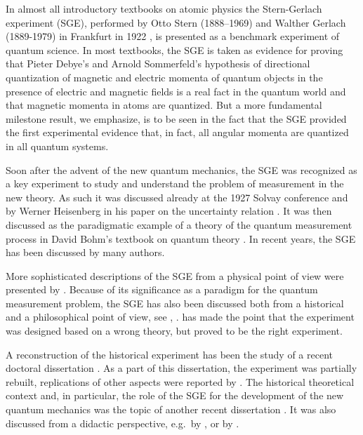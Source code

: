 \documentclass[12pt]{article}
\begin{document}
In almost all introductory textbooks on atomic physics the Stern-Gerlach experiment (SGE), performed by Otto Stern (1888--1969) and Walther Gerlach (1889-1979) in Frankfurt in 1922 
\citep{SternO1920Messung,GerlachWEtal1921Nachweis,GerlachWEtal1922Nachweis,GerlachWEtal1924Richtungsquantelung,GerlachW1925Richtungsquantelung}, is presented as a benchmark experiment of quantum science. In most textbooks, the SGE is taken as evidence for proving that Pieter Debye's \citep{DebyeP1916Quantenhypothese} and Arnold Sommerfeld's \citep{SommerfeldA1916Theorie} hypothesis of directional quantization of magnetic and electric momenta of quantum objects in the presence of electric and magnetic fields is a real fact in the quantum world and that magnetic momenta in atoms are quantized. But a more fundamental milestone result, we emphasize, is to be seen in the fact that the SGE provided the first experimental  evidence that, in fact, all angular momenta are quantized in all quantum systems. 

Soon after the advent of the new quantum mechanics, the SGE was recognized as a key experiment to study and understand the problem of measurement in the new theory. As such it was discussed already at the 1927 Solvay conference \cite[esp.~pp.~436, 478]{BacciagaluppiGEtAl2009Crossroads} and by Werner Heisenberg in his paper on the uncertainty relation \citep{HeisenbergW1927Inhalt}. It was then discussed as the paradigmatic example of a theory of the quantum measurement process in David Bohm's textbook on quantum theory \cite[ch.~22]{BohmD1951Quantum}. In recent years, the SGE has been discussed by many authors.

More sophisticated descriptions of the SGE from a physical point of view were presented by \cite{ScullyMOEtal1978Reduction,MackintoshAR1983Experiment,ScullyMOEtal1987Theory,ReinischG1999Experiment}.
Because of its significance as a paradigm for the quantum measurement problem, the SGE has also been discussed both from a historical and a philosophical point of view, see \citep{BernsteinJ2010Experiment}, \citep{SauerT2016Perspectives}. \cite{WeinertF1995Theory} has made the point that the experiment was designed based on a wrong theory, but proved to be the right experiment.

A reconstruction of the historical experiment has been the study of a recent doctoral dissertation \citep{TrageserW2011Effekt}. As a part of this dissertation, the experiment was partially rebuilt, replications of other aspects were reported by \cite{FriedrichBEtal2003Stern,FriedrichBEtal2005Stern}. The historical theoretical context and, in particular, the role of the SGE for the development of the new quantum mechanics was the topic of another recent dissertation \citep{Pie2015Experiment}. It was also discussed from a didactic perspective, e.g.\ by \cite{FrenchAPEtal1978Introduction}, or by \cite{PlattD1992Analysis}.
\end{document}
